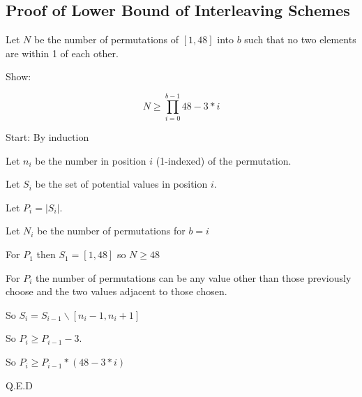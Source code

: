 \documentclass[sigconf]{acmart}
\begin{document}




\begin{appendices}
\section{Proof of Lower Bound of Interleaving Schemes}
\label{ap:proof_lower_bound}

Let $N$ be the number of permutations of $[1, 48]$ into $b$ such that no two elements are within 1 of each other. \newline

Show: 

$$N \geq \prod_{i=0}^{b-1} 48 - 3*i$$\newline

Start: By induction\newline

Let $n_i$ be the number in position $i$ (1-indexed) of the permutation.

Let $S_i$ be the set of potential values in position $i$.

Let $P_i = |S_i|$.

Let $N_i$ be the number of permutations for $b=i$\newline

For $P_1$ then $S_1 = [1, 48]$ so $N \geq 48$

For $P_i$ the number of permutations can be any value other than those previously choose and the two values adjacent to those chosen. 

So $S_i = S_{i-1}\backslash[n_i-1,n_i+1]$

So $P_i \geq P_{i-1} - 3$. 

So $P_i \geq P_{i-1} * (48-3 * i)$\newline

Q.E.D\newline
\end{appendices}
\end{document}
